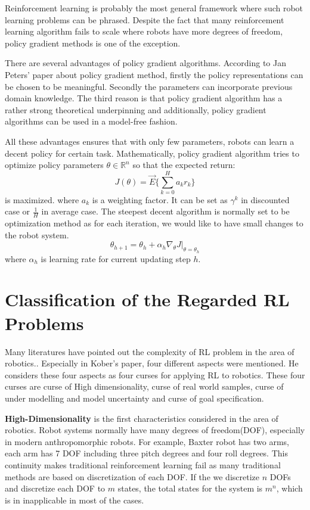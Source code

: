 \documentclass[officiallayout]{tktla}
\begin{document}
Reinforcement learning is probably the most general framework where such robot learning problems can be phrased. Despite the fact that many reinforcement learning algorithm fails to scale where robots have more degrees of freedom, policy gradient methods is one of the exception.

There are several advantages of policy gradient algorithms. According to Jan Peters' paper about policy gradient method\cite{peters2006policy}, firstly the policy representations can be chosen to be meaningful. Secondly the parameters can incorporate previous domain knowledge. The third reason is that policy gradient algorithm has a rather strong theoretical underpinning and additionally, policy gradient algorithms can be used in a model-free fashion.

All these advantages ensures that with only few parameters, robots can learn a decent policy for certain task. Mathematically, policy gradient algorithm tries to optimize policy parameters $\theta \in \mathbb{R}^n$ so that the expected return:
\begin{equation}
J(\theta) = \vec{E}\{\sum_{k=0}^Ha_k r_k\}
\end{equation}
is maximized. where $a_k$ is a weighting factor. It can be set as $\gamma^k$ in discounted case or $\frac{1}{H}$ in average case. The steepest decent algorithm is normally set to be optimization method as for each iteration, we would like to have small changes to the robot system. 
\begin{equation}
\theta_{h+1} = \theta_h + \alpha_h \nabla_\theta J|_{\theta=\theta_h}
\end{equation}
where $\alpha_h$ is learning rate for current updating step $h$.

\section{Classification of the Regarded RL Problems}
Many literatures have pointed out the complexity of RL problem in the area of robotics.\cite{Kober2013}\cite{peters2006policy}. Especially in Kober's paper\cite{Kober2013}, four different aspects were mentioned. He considers these four aspects as four curses for applying RL to robotics. These four curses are curse of High dimensionality, curse of real world samples, curse of under modelling and model uncertainty and curse of goal specification.

\textbf{High-Dimensionality} is the first characteristics considered in the area of robotics. Robot systems normally have many degrees of freedom(DOF), especially in modern anthropomorphic robots. For example, Baxter robot has two arms, each arm has 7 DOF including three pitch degrees and four roll degrees. This continuity makes traditional reinforcement learning fail as many traditional methods are based on discretization of each DOF. If the we discretize $n$ DOFs and discretize each DOF to $m$ states, the total states for the system is $m^n$, which is in inapplicable in most of the cases.
\end{document}
